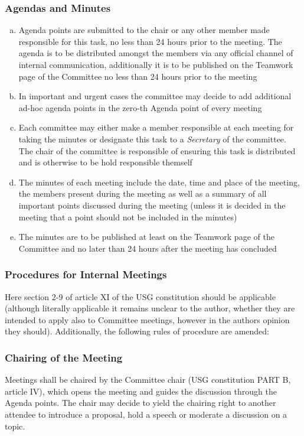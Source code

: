 \subsubsection[Agendas and Minutes]{Agendas and Minutes}
\begin{enumerate}[a)]
	\item Agenda points are submitted to the chair or any other member made responsible for this task, no less than 24 hours prior to the meeting. The agenda is to be distributed amongst the members via any official channel of internal communication, additionally it is to be published on the Teamwork page of the Committee no less than 24 hours prior to the meeting 
	\item In important and urgent cases the committee may decide to add additional ad-hoc agenda points in the zero-th Agenda point of every meeting
	\item Each committee may either make a member responsible at each meeting for taking the minutes or designate this task to a \emph{Secretary} of the committee. The chair of the committee is responsible of ensuring this task is distributed and is otherwise to be hold responsible themself
	\item The minutes of each meeting include the date, time and place of the meeting, the members present during the meeting as well as a summary of all important points discussed during the meeting (unless it is decided in the meeting that a point should not be included in the minutes)
	\item The minutes are to be published at least on the Teamwork page of the Committee and no later than 24 hours after the meeting has concluded
\end{enumerate}
\subsubsection[Meeting Procedures]{Procedures for Internal Meetings}
Here section 2-9 of article XI of the USG constitution should be applicable (although literally applicable it remains unclear to the author, whether they are intended to apply also to Committee meetings, however in the authors opinion they should). Additionally, the following rules of procedure are amended:
\subsubsection{Chairing of the Meeting}
Meetings shall be chaired by the Committee chair (USG constitution PART B, article IV), which opens the meeting and guides the discussion through the Agenda points. The chair may decide to yield the chairing right to another attendee to introduce a proposal, hold a speech or moderate a discussion on a topic.
